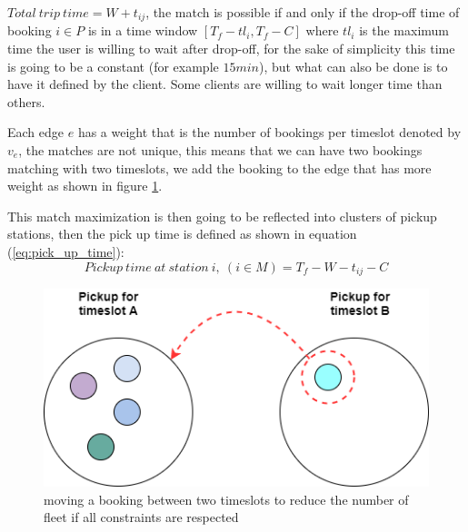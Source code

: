 \documentclass{article}
\begin{document}
\noindent$Total\ trip\ time = W + t_{ij} $, the match is possible if and only if the drop-off time of booking $i \in P$ is in a time window $[T_f - tl_i,T_f - C ]$ where
$tl_i$ is the maximum time the user is willing to wait after drop-off, for the sake of simplicity this time is going to be a constant (for example $15min$), but what can also be done is to have it defined by the client. Some clients are willing to
wait longer time than others.

Each edge $e$ has a weight that is the number of bookings per timeslot denoted by $v_e$, the matches are not unique, this means that we can have two bookings matching with two timeslots, we add the booking to the edge that has more weight as shown in figure \ref{fig:timelsot}.


This match maximization is then going to be reflected into clusters of pickup stations, then the pick up time is defined as shown in equation (\ref{eq:pick_up_time}):
\begin{equation}
\label{eq:pick_up_time}
Pickup \ time \ at \ station\ i, \ (i \in M) = T_f - W - t_{ij} - C
\end{equation}


\begin{figure}[H]
    \centering 
  \includegraphics[width=0.7\linewidth]{pictures/Timeslot}
  \caption{moving a booking between two timeslots to reduce the number of fleet if all constraints are respected}
\label{fig:timelsot}
\end{figure}
\end{document}
